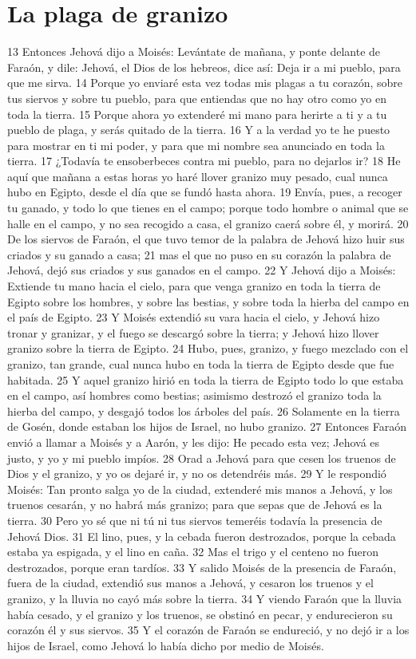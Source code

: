 \section*{La plaga de granizo}
13 Entonces Jehová dijo a Moisés: Levántate de mañana, y ponte delante de Faraón, y dile: Jehová, el Dios de los hebreos, dice así: Deja ir a mi pueblo, para que me sirva.
14 Porque yo enviaré esta vez todas mis plagas a tu corazón, sobre tus siervos y sobre tu pueblo, para que entiendas que no hay otro como yo en toda la tierra.
15 Porque ahora yo extenderé mi mano para herirte a ti y a tu pueblo de plaga, y serás quitado de la tierra.
16 Y a la verdad yo te he puesto para mostrar en ti mi poder, y para que mi nombre sea anunciado en toda la tierra.
17 ¿Todavía te ensoberbeces contra mi pueblo, para no dejarlos ir?
18 He aquí que mañana a estas horas yo haré llover granizo muy pesado, cual nunca hubo en Egipto, desde el día que se fundó hasta ahora.
19 Envía, pues, a recoger tu ganado, y todo lo que tienes en el campo; porque todo hombre o animal que se halle en el campo, y no sea recogido a casa, el granizo caerá sobre él, y morirá.
20 De los siervos de Faraón, el que tuvo temor de la palabra de Jehová hizo huir sus criados y su ganado a casa;
21 mas el que no puso en su corazón la palabra de Jehová, dejó sus criados y sus ganados en el campo.
22 Y Jehová dijo a Moisés: Extiende tu mano hacia el cielo, para que venga granizo en toda la tierra de Egipto sobre los hombres, y sobre las bestias, y sobre toda la hierba del campo en el país de Egipto.
23 Y Moisés extendió su vara hacia el cielo, y Jehová hizo tronar y granizar, y el fuego se descargó sobre la tierra; y Jehová hizo llover granizo sobre la tierra de Egipto.
24 Hubo, pues, granizo, y fuego mezclado con el granizo, tan grande, cual nunca hubo en toda la tierra de Egipto desde que fue habitada.
25 Y aquel granizo hirió en toda la tierra de Egipto todo lo que estaba en el campo, así hombres como bestias; asimismo destrozó el granizo toda la hierba del campo, y desgajó todos los árboles del país.
26 Solamente en la tierra de Gosén, donde estaban los hijos de Israel, no hubo granizo.
27 Entonces Faraón envió a llamar a Moisés y a Aarón, y les dijo: He pecado esta vez; Jehová es justo, y yo y mi pueblo impíos.
28 Orad a Jehová para que cesen los truenos de Dios y el granizo, y yo os dejaré ir, y no os detendréis más.
29 Y le respondió Moisés: Tan pronto salga yo de la ciudad, extenderé mis manos a Jehová, y los truenos cesarán, y no habrá más granizo; para que sepas que de Jehová es la tierra.
30 Pero yo sé que ni tú ni tus siervos temeréis todavía la presencia de Jehová Dios.
31 El lino, pues, y la cebada fueron destrozados, porque la cebada estaba ya espigada, y el lino en caña.
32 Mas el trigo y el centeno no fueron destrozados, porque eran tardíos.
33 Y salido Moisés de la presencia de Faraón, fuera de la ciudad, extendió sus manos a Jehová, y cesaron los truenos y el granizo, y la lluvia no cayó más sobre la tierra.
34 Y viendo Faraón que la lluvia había cesado, y el granizo y los truenos, se obstinó en pecar, y endurecieron su corazón él y sus siervos.
35 Y el corazón de Faraón se endureció, y no dejó ir a los hijos de Israel, como Jehová lo había dicho por medio de Moisés.

